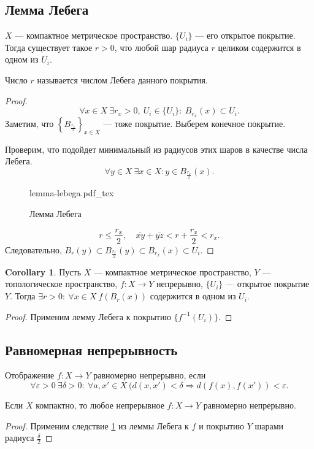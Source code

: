 \documentclass[11pt]{book}
\newcommand{\incfig}[1]{%
    \def\svgwidth{\columnwidth}
    {#1.pdf_tex}
}
\renewcommand{\le}{\leqslant}
\theoremstyle{definition}
\theoremstyle{plain}
\theoremstyle{plain}
\theoremstyle{definition}
\newtheorem*{cor}{Corollary}
\theoremstyle{remark}
\begin{document}
\subsection{Лемма Лебега}
\begin{thm}
    $ X$ --- компактное метрическое пространство.  $ \{U_i\}$ --- его открытое покрытие.
    Тогда существует такое $ r>0$, что любой шар радиуса $ r$ целиком содержится в одном из  $ U_i$.
    \begin{defn}
	Число $ r$ называется числом Лебега данного покрытия.
    \end{defn}
\end{thm}
\begin{proof}
    \[
	\forall x \in X ~ \exists r_x >0, ~ U_i \in  \{U_i\}: ~ B_{r_x}(x) \subset U_i
    .\]
    Заметим, что $ \left\{B_{\frac{r_x}{2}}\right\}_{x \in X}$ --- тоже покрытие. Выберем конечное покрытие.

    Проверим, что подойдет минимальный из радиусов этих шаров в качестве числа Лебега.
    \[
	\forall y \in X ~\exists x \in X: y \in B_{\frac{r_x}{2}}(x)
    .\]
    \begin{figure}[ht]
	\centering
	\incfig{lemma-lebega}
	\caption{Лемма Лебега}
	\label{fig:lemma-lebega}
    \end{figure}
    \[
	r \le  \frac{r_x}{2}, \quad \overline{xy} + \overline{yz} < r + \frac{r_x}{2} <  r_x
    .\]
    Следовательно, $ B_r (y) \subset B_{\frac{r_x}{2}}(y) \subset B_{r_x}(x) \subset U_i$.
\end{proof}
\begin{cor}\label{cor_ll}
    Пусть $ X$ --- компактное метрическое пространство,  $ Y$ ---  топологическое пространство, $ f: X \to  Y$ непрерывно, $ \{U_i\}$ --- открытое покрытие $ Y$.
    Тогда  $ \exists r >0: ~ \forall x \in  X ~ f(B_r(x)) \text{ содержится в одном из } U_i$.
\end{cor}
\begin{proof}
    Применим лемму Лебега к покрытию $ \{f^{-1}(U_i)\}$.
\end{proof}
\subsection{Равномерная непрерывность}
\begin{defn}
    Отображение $ f: X \to  Y$ равномерно непрерывно, если
    \[
	\forall  \varepsilon >0 ~ \exists  \delta > 0: ~ \forall a, x' \in  X ~ (d(x, x') < \delta \Longrightarrow  d(f(x), f(x')) < \varepsilon
    .\]
\end{defn}
\begin{thm}
    Если $ X$ компактно, то любое непрерывное  $ f: X \to  Y$ равномерно непрерывно.
\end{thm}
\begin{proof}
    Применим следствие \ref{cor_ll} из леммы Лебега к $ f$ и покрытию  $ Y$ шарами радиуса $ \frac{\delta}{2}$
\end{proof}
\end{document}
